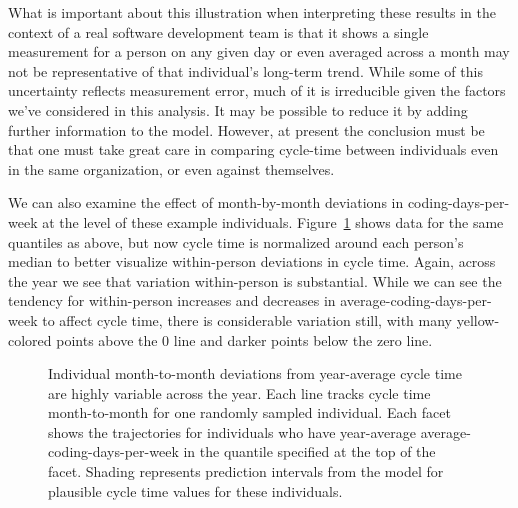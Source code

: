 \documentclass[manuscript,screen,review]{acmart}
\begin{document}
What is important about this illustration when interpreting these
results in the context of a real software development team is that it
shows a single measurement for a person on any given day or even
averaged across a month may not be representative of that individual's
long-term trend. While some of this uncertainty reflects measurement
error, much of it is irreducible given the factors we've considered in
this analysis. It may be possible to reduce it by adding further
information to the model. However, at present the conclusion must be
that one must take great care in comparing cycle-time between
individuals even in the same organization, or even against themselves.

We can also examine the effect of month-by-month deviations in
coding-days-per-week at the level of these example individuals.
Figure~\ref{fig-wi-ct-traj} shows data for the same quantiles as above,
but now cycle time is normalized around each person's median to better
visualize within-person deviations in cycle time. Again, across the year
we see that variation within-person is substantial. While we can see the
tendency for within-person increases and decreases in
average-coding-days-per-week to affect cycle time, there is considerable
variation still, with many yellow-colored points above the 0 line and
darker points below the zero line.

\begin{figure}


\caption[Individual month-to-month deviations from year-average cycle
time are highly variable across the
year]{\label{fig-wi-ct-traj}Individual month-to-month deviations from
year-average cycle time are highly variable across the year. Each line
tracks cycle time month-to-month for one randomly sampled individual.
Each facet shows the trajectories for individuals who have year-average
average-coding-days-per-week in the quantile specified at the top of the
facet. Shading represents prediction intervals from the model for
plausible cycle time values for these individuals.}

\end{figure}%
\end{document}
